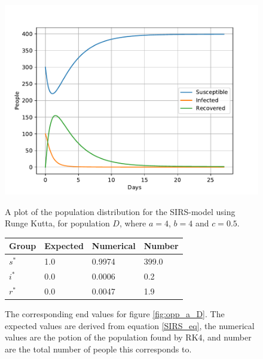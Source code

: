 \documentclass[a4paper]{article}
\begin{document}
	\begin{figure}[!htb]
		\centering
		\begin{minipage}{0.49\textwidth}
			\centering
			\includegraphics[scale=0.6]{../plots/opp_a_D.pdf}
			\caption{A plot of the population distribution for the SIRS-model using Runge Kutta, for population $D$, where $a=4$, $b=4$ and $c=0.5$. }\label{fig:opp_a_D}
		\end{minipage}
		\begin{minipage}{0.49\textwidth}
			\centering
			\captionsetup{type=table} %
			\begin{tabular}{|l|l|l|l|}
				\hline
				Group & Expected & Numerical   & Number  \\ \hline
				$s^*$ & 1.0 & 0.9974 & 399.0 \\ \hline
				$i^*$ & 0.0 & 0.0006 & 0.2 \\ \hline
				$r^*$ & 0.0 & 0.0047 & 1.9 \\ \hline
			\end{tabular}
			\caption{The corresponding end values for figure \ref{fig:opp_a_D}. The expected values are derived from equation \ref{SIRS_eq}, the numerical values are the potion of the population found by RK4, and number are the total number  of people this corresponds to.}\label{tab:opp_a_D}
		\end{minipage}
	\end{figure}
	
\end{document}
